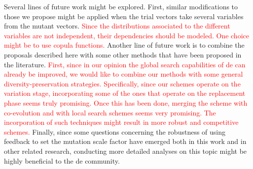 \documentclass[review,3p]{elsarticle}
\newcommand{\DE}{{\sc de}}
\begin{document}
Several lines of future work might be explored.
%
First, similar modifications to those we propose might be applied when the trial
vectors take several variables from the mutant vectors.
%
\textcolor{red}{
Since the distributions associated to the different variables are not independent, 
their dependencies should be modeled.
%
One choice might be to use copula functions.
}
%
%
Another line of future work is to combine the proposals described here with some other methods
that have been proposed in the literature.
\textcolor{red}{
%
First, since in our opinion the global search capabilities of \DE{} can already be improved, we would like to combine
our methods with some general diversity-preservation strategies.
%
Specifically, since our schemes operate on the variation stage, incorporating some of the ones that operate
on the replacement phase seems truly promising.
%
Once this has been done, merging the scheme with co-evolution and with local search schemes
seems very promising.
%
The incorporation of such techniques might result in more robust and competitive schemes.
}
%
Finally, since some questions concerning the robustness of using feedback to set the mutation scale factor
have emerged both in this work and in other related research, conducting more detailed analyses on this topic might
be highly beneficial to the \DE{} community.


%
\end{document}
